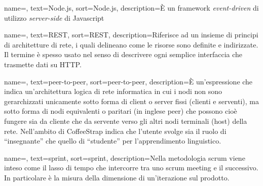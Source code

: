{
    name=,
    text=Node.js,
    sort=Node.js,
    description={È un framework \textit{event-driven} di utilizzo \textit{server-side} di Javascript}
}

{
    name=,
    text=REST,
    sort=REST,
    description={Riferisce ad un insieme di principi di architetture di rete, i quali delineano come le risorse sono definite e indirizzate. Il termine è spesso usato nel senso di descrivere ogni semplice interfaccia che trasmette dati su HTTP.}
}

{
    name=,
    text=peer-to-peer,
    sort=peer-to-peer,
    description={È un'espressione che indica un'architettura logica di rete informatica in cui i nodi non sono gerarchizzati unicamente sotto forma di client o server fissi (clienti e serventi), ma sotto forma di nodi equivalenti o paritari (in inglese peer) che possono cioè fungere sia da cliente che da servente verso gli altri nodi terminali (host) della rete. Nell'ambito di CoffeeStrap indica che l'utente svolge sia il ruolo di ``insegnante'' che quello di ``studente'' per l'apprendimento linguistico.}
}

{
    name=,
    text=sprint,
    sort=sprint,
    description={Nella metodologia scrum viene inteso come il lasso di tempo che intercorre tra uno scrum meeting e il successivo. In particolare è la misura della dimensione di un'iterazione sul prodotto.}
}
